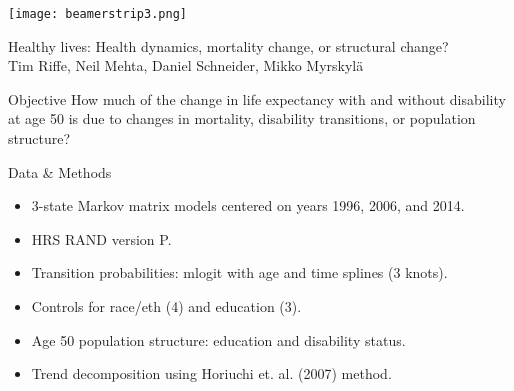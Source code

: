 \documentclass[20pt,usenames,dvipsnames]{beamer}
\begin{document}

\begin{frame}[plain]
	\vspace{-3cm}
 \centerline{\texttt{[image: beamerstrip3.png]}}

	
	\huge
	\vspace{1em}
	
	Healthy lives: Health dynamics, mortality change, or structural change?\\
	\vspace{1em}
	\large 
	Tim Riffe, Neil Mehta, Daniel Schneider, Mikko Myrskyl\"a 
\end{frame}
\begin{frame}[plain]
\Large
\begin{block}{Objective}
How much of the change in life expectancy with and without disability at age 50 is due to changes in mortality, disability transitions, or population structure?
\end{block}
\end{frame}

\begin{frame}[plain]
\Large
\begin{block}{Data \& Methods}
\begin{itemize}[<+->]
\item 3-state Markov matrix models centered on years 1996, 2006, and 2014. 
\item HRS RAND version P. 
\item Transition probabilities: mlogit with age and time splines (3 knots).
\item Controls for race/eth (4) and education (3). 
\item Age 50 population structure: education and disability status.
\item Trend decomposition using Horiuchi et. al. (2007) method.
\end{itemize}
\end{block}
\end{frame}
\end{document}
